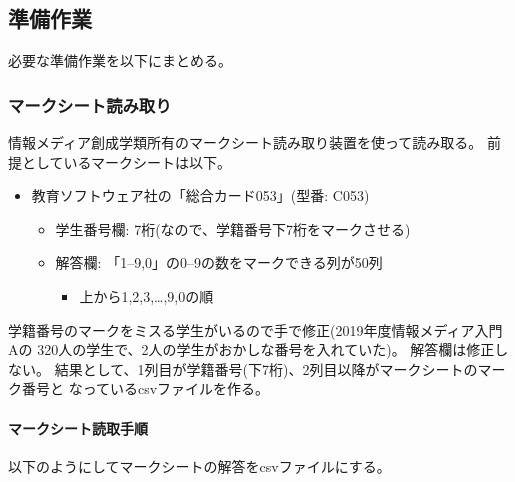 \subsection{準備作業}
\label{準備作業}

必要な準備作業を以下にまとめる。

\subsubsection{マークシート読み取り}
\label{マークシート読み取り}

情報メディア創成学類所有のマークシート読み取り装置を使って読み取る。
前提としているマークシートは以下。

\begin{itemize}
\item 教育ソフトウェア社の「総合カード053」(型番: C053)

\begin{itemize}
\item 学生番号欄: 7桁(なので、学籍番号下7桁をマークさせる)

\item 解答欄: 「1--9,0」の0--9の数をマークできる列が50列

\begin{itemize}
\item 上から1,2,3,{\ldots},9,0の順

\end{itemize}

\end{itemize}

\end{itemize}
学籍番号のマークをミスる学生がいるので手で修正(2019年度情報メディア入門Aの
320人の学生で、2人の学生がおかしな番号を入れていた)。
解答欄は修正しない。
結果として、1列目が学籍番号(下7桁)、2列目以降がマークシートのマーク番号と
なっているcsvファイルを作る。

\paragraph{マークシート読取手順}
\label{マークシート読取手順}

以下のようにしてマークシートの解答をcsvファイルにする。

